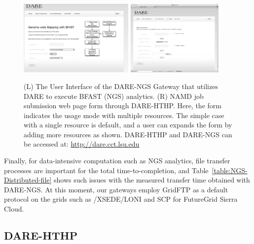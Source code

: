 \documentclass[]{svjour3}
\begin{document}
\begin{figure}
 \centering
\includegraphics[width=0.5\textwidth]{figures/screenshot-ngs.png} \hspace{0.1in}
\includegraphics[width=0.42\textwidth]{figures/screenshot-hthp.png}
  \caption{\small (L) The User Interface of the DARE-NGS Gateway that
    utilizes DARE to execute BFAST (NGS) analytics. (R) NAMD job
    submission web page form through DARE-HTHP. Here, the form
    indicates the usage mode with multiple resources. The simple case
    with a single resource is default, and a user can expands the form
    by adding more resources as shown. DARE-HTHP and DARE-NGS can be accessed at:
    \url{http://dare.cct.lsu.edu} }
  \label{fig:NAMD2}
\end{figure}

 

Finally, for data-intensive computation such as NGS analytics, file transfer
processes are important for the total time-to-completion, and
Table~\ref{table:NGS-Distributed-file} shows such issues with the
measured transfer time obtained with DARE-NGS. At this moment, our
gateways employ GridFTP as a default protocol on the grids such as
/XSEDE/LONI and SCP for FutureGrid Sierra Cloud.



\subsection{DARE-HTHP}
\end{document}
